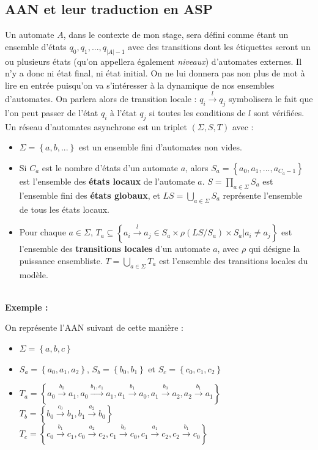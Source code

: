 \documentclass[10pt,a4paper]{article}
\begin{document}
\subsection{AAN et leur traduction en ASP}
Un automate $A$, dans le contexte de mon stage, sera défini comme étant un ensemble d'états $q_0, q_1, ..., q_{|A|-1}$ avec des transitions dont les étiquettes seront un ou plusieurs états (qu'on appellera également \emph{niveaux}) 
d'automates externes. Il n'y a donc ni état final, ni état initial. On ne lui donnera pas non plus de mot à lire en entrée puisqu'on va s'intéresser à la dynamique de nos ensembles d'automates. On parlera alors de 
transition locale : $q_i\xrightarrow{l}q_j$ symbolisera le fait que l'on peut passer de l'état $q_i$ à l'état $q_j$ si toutes les conditions de $l$ sont vérifiées.\\
Un réseau d'automates asynchrone est un triplet $(\Sigma,S,T)$ avec :
\begin{itemize}
	\item $\Sigma=\left\{a,b,...\right\}$ est un ensemble fini d'automates non vides.
	\item Si $C_a$ est le nombre d'états d'un automate $a$, alors $S_a=\left\{a_0,a_1,...,a_{C_a-1}\right\}$ est l'ensemble des \textbf{états locaux} de l'automate $a$. $S=\displaystyle{\prod_{a\in\Sigma}}S_a$ est l'ensemble 
	fini des \textbf{états globaux}, et $LS=\displaystyle{\bigcup_{a\in\Sigma}}S_a$ représente l'ensemble de tous les états locaux.
	\item Pour chaque $a\in\Sigma$, $T_a\subseteq\left\{a_i\xrightarrow{l}a_j\in S_a\times\rho(LS/S_a)\times S_a|a_i\neq a_j\right\}$ est l'ensemble des \textbf{transitions locales} d'un automate $a$, avec 
	$\rho$ qui désigne la puissance ensembliste. $T=\displaystyle{\bigcup_{a\in\Sigma}}T_a$ est l'ensemble des transitions locales du modèle.\\ \\
\end{itemize}
\hypertarget{exemple}{\textbf{Exemple :}} On représente l'AAN suivant de cette manière :
\begin{itemize}
	\item $\Sigma =\left\{a,b,c\right\}$
	\item $S_a=\left\{a_0,a_1,a_2\right\}$, $S_b=\left\{b_0,b_1\right\}$ et $S_c=\left\{c_0,c_1,c_2\right\}$
	\item $T_a = \left\{a_0\xrightarrow{b_0}a_1,a_0\xrightarrow{b_1,c_1}a_1,a_1\xrightarrow{b_1}a_0,a_1\xrightarrow{b_0}a_2,a_2\xrightarrow{b_1}a_1\right\}$\\
	$T_b=\left\{b_0\xrightarrow{c_0}b_1,b_1\xrightarrow{a_2}b_0\right\}$\\
	$T_c=\left\{c_0\xrightarrow{b_1}c_1,c_0\xrightarrow{a_2}c_2,c_1\xrightarrow{b_0}c_0,c_1\xrightarrow{a_1}c_2,c_2\xrightarrow{b_1}c_0\right\}$
\end{itemize}
\end{document}
